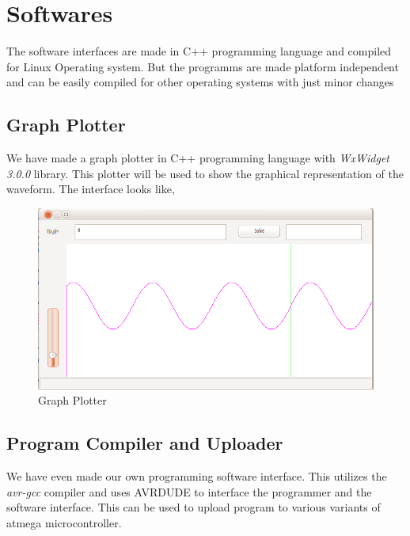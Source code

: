 \documentclass[11pt,a4paper]{article}
\begin{document}
\newpage
\section{Softwares}
The software interfaces are made in C++ programming language and compiled for Linux Operating system. But the programms are made platform independent and can be easily compiled for other operating systems with just minor changes
\subsection{Graph Plotter}
We have made a graph plotter in C++ programming language with \textit{WxWidget 3.0.0} library. This plotter will be used to show the graphical representation of the waveform. The interface looks like,
\begin{figure}[hbtp]
	\centering
	\includegraphics[scale=.6]{Images/Plotter.png}
	\caption{Graph Plotter}
\end{figure}


\subsection{Program Compiler and Uploader}	
We have even made our own programming software interface. This utilizes the \emph{avr-gcc} compiler and uses AVRDUDE to interface the programmer and the software interface. This can be used to upload program to various variants of atmega microcontroller.\\
\end{document}
